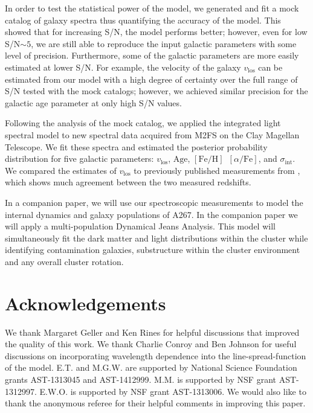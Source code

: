 \documentclass[twocolumn]{aastex6}
\def\feh{\mathrm{[Fe/H]}}
\def\afe{[\alpha/\mathrm{Fe}]}
\def\age{\mathrm{Age}}
\def\vlos{v_\mathrm{los}}
\def\disp{\sigma_\mathrm{int}}
\begin{document}
In order to test the statistical power of the model, we generated and fit a mock catalog of galaxy spectra thus quantifying the accuracy of the model.
This showed that for increasing S/N, the model performs better; however, even for low S/N$\sim5$, we are still able to reproduce the input galactic parameters with some level of precision.
Furthermore, some of the galactic parameters are more easily estimated at lower S/N.
For example, the velocity of the galaxy $\vlos$ can be estimated from our model with a high degree of certainty over the full range of S/N tested with the mock catalogs; however, we achieved similar precision for the galactic age parameter at only high S/N values.

Following the analysis of the mock catalog, we applied the integrated light spectral model to new spectral data acquired from M2FS on the Clay Magellan Telescope.
We fit these spectra and estimated the posterior probability distribution for five galactic parameters: $\vlos$, $\age$, $\feh$\, $\afe$, and $\disp$.
We compared the estimates of $\vlos$ to previously published measurements from \citet{Rines2013}, which shows much agreement between the two measured redshifts.

In a companion paper, we will use our spectroscopic measurements to model the internal dynamics and galaxy populations of A267.
In the companion paper we will apply a multi-population Dynamical Jeans Analysis.
This model will simultaneously fit the dark matter and light distributions within the cluster while identifying contamination galaxies, substructure within the cluster environment and any overall cluster rotation.

\section*{Acknowledgements}

We thank Margaret Geller and Ken Rines for helpful discussions that improved the quality of this work.
We thank Charlie Conroy and Ben Johnson for useful discussions on incorporating wavelength dependence into the line-spread-function of the model.
E.T. and M.G.W. are supported by National Science Foundation grants AST-1313045 and AST-1412999.  M.M. is supported by NSF grant AST-1312997.  E.W.O. is supported by NSF grant AST-1313006.
We would also like to thank the anonymous referee for their helpful comments in improving this paper.

{}

\label{lastpage}
\end{document}
